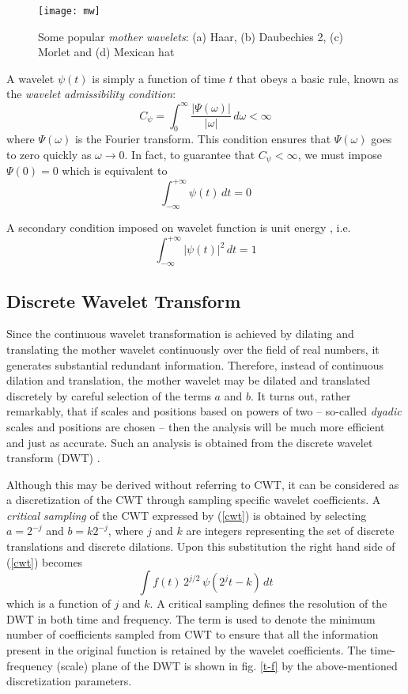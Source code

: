 \documentclass[a4paper,11pt]{report}
\begin{document}
\begin{figure}[h] 
\centering
\texttt{[image: mw]}
\caption{Some popular \emph{mother wavelets}: (a) Haar, (b) Daubechies 2, (c) Morlet and (d) Mexican hat} \label{fig.1}
\end{figure} 

A wavelet $\psi(t)$ is simply a function of time $t$ that obeys a basic rule, known as the \emph{wavelet admissibility condition}:
\begin{equation}
C_{\psi} = \int_{0}^{\infty} \frac{|\Psi(\omega)|}{|\omega|}\,d\omega < \infty
\end{equation}
where $\Psi(\omega)$ is the Fourier transform. This condition ensures that $\Psi(\omega)$ goes to zero quickly as $\omega \rightarrow 0$. In fact, to guarantee that $C_{\psi} < \infty$, we must impose $\Psi(0) = 0$ which is equivalent to
\begin{equation}
\int_{-\infty}^{+\infty} \psi(t)\,dt = 0 
\end{equation}

A secondary condition imposed on wavelet function is unit energy \cite{bopardikar}, i.e.
\begin{equation}
\int_{-\infty}^{+\infty} |\psi(t)|^{2}\,dt = 1 
\end{equation}

\subsection{Discrete Wavelet Transform}
Since the continuous wavelet transformation is achieved  by dilating and translating the mother wavelet continuously over the field of real numbers, it generates substantial redundant information. Therefore, instead of continuous dilation and translation, the mother wavelet may be dilated and translated discretely by careful selection of the terms $a$ and $b$. It turns out, rather remarkably, that if scales and positions based on powers of two -- so-called \emph{dyadic} scales and positions are chosen -- then the analysis will be much more efficient and just as accurate. Such an analysis is obtained from the discrete wavelet transform (DWT) \cite{daub}.

Although this may be derived without referring to CWT, it can be considered as a discretization of the CWT through sampling specific wavelet coefficients. A \emph{critical sampling} of the CWT expressed by (\ref{cwt}) is obtained by selecting $a=2^{-j}$ and $b=k2^{-j}$, where $j$ and $k$ are integers representing  the set of discrete translations and discrete dilations. Upon this substitution the right hand side of (\ref{cwt}) becomes
\begin{displaymath}
\int f(t)\,2^{j/2}\,\psi(2^{j}t - k)\,dt
\end{displaymath}
which is a function of $j$ and $k$. A critical sampling defines the resolution of the DWT in both time and frequency. The term is used to denote the minimum number of coefficients sampled from CWT to ensure that all the information present in the original function is retained by the wavelet coefficients. The time-frequency (scale) plane of the DWT is shown in fig. \ref{t-f} by the above-mentioned discretization parameters. 
\end{document}
